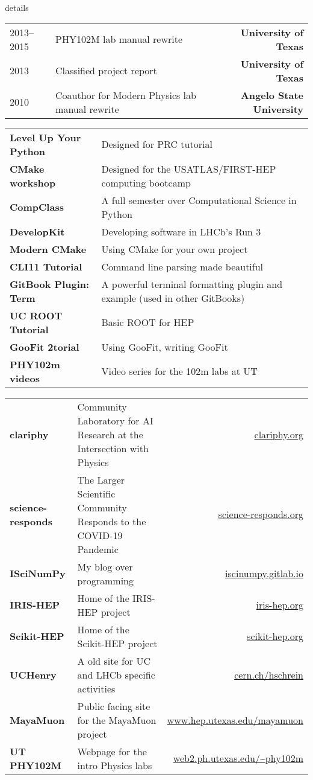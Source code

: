 \documentclass[10pt,letterpaper]{moderncv}
\begin{document}
\begin{taggedblock}{details}
\begin{tabularx}{\textwidth}{p{.8in}X>{\bfseries}r}
2013--2015 & PHY102M lab manual rewrite & University of Texas \\
2013 & Classified project report & University of Texas\\
2010 & Coauthor for Modern Physics lab manual rewrite & Angelo State University\\
\end{tabularx}
\end{taggedblock}


\begin{tabularx}{\textwidth}{>{\bfseries}p{1.6in}X}
Level Up Your Python & Designed for PRC tutorial \\
CMake workshop & Designed for the USATLAS/FIRST-HEP computing bootcamp \\
CompClass & A full semester over Computational Science in Python \\
DevelopKit & Developing software in LHCb’s Run 3 \\
Modern CMake & Using CMake for your own project \\
CLI11 Tutorial & Command line parsing made beautiful \\
GitBook Plugin: Term & A powerful terminal formatting plugin and example (used in other GitBooks) \\
UC ROOT Tutorial & Basic ROOT for HEP \\
GooFit 2torial & Using GooFit, writing GooFit \\
PHY102m videos & Video series for the 102m labs at UT \\
\end{tabularx}


\begin{tabularx}{\textwidth}{>{\bfseries}p{1.45in}Xr}
clariphy & Community Laboratory for AI Research at the Intersection with Physics & \url{clariphy.org} \\
science-responds & The Larger Scientific Community Responds to the COVID-19 Pandemic & \url{science-responds.org} \\
ISciNumPy & My blog over programming & \url{iscinumpy.gitlab.io} \\
IRIS-HEP & Home of the IRIS-HEP project & \url{iris-hep.org} \\
Scikit-HEP & Home of the Scikit-HEP project & \url{scikit-hep.org} \\
UCHenry & A old site for UC and LHCb specific activities & \url{cern.ch/hschrein}  \\
MayaMuon & Public facing site for the MayaMuon project & \url{www.hep.utexas.edu/mayamuon} \\
UT PHY102M & Webpage for the intro Physics labs & \url{web2.ph.utexas.edu/~phy102m}  \\
\end{tabularx}
\end{document}
